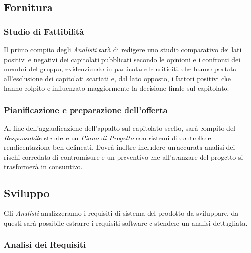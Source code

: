 \documentclass{scalatekids-article}
\begin{document}
\subsection{Fornitura}

\subsubsection{Studio di Fattibilità}

Il primo compito degli \textit{Analisti} sarà di redigere uno studio comparativo
dei lati positivi e negativi dei capitolati pubblicati secondo le opinioni e i
confronti dei membri del gruppo, evidenziando in particolare le criticità che
hanno portato all'esclusione dei capitolati scartati e, dal lato opposto, i
fattori positivi che hanno colpito e influenzato maggiormente la decisione
finale sul capitolato.

\subsubsection{Pianificazione e preparazione dell'offerta}

Al fine dell'aggiudicazione dell'appalto sul capitolato scelto, sarà compito del
\textit{Responsabile} stendere un \textit{Piano di Progetto} con sistemi di
controllo e rendicontazione ben delineati. Dovrà inoltre includere un'accurata
analisi dei rischi corredata di contromisure e un preventivo che all'avanzare
del progetto si trasformerà in consuntivo.

\subsection{Sviluppo}

Gli \textit{Analisti} analizzeranno i requisiti di sistema del prodotto da
sviluppare, da questi sarà possibile estrarre i requisiti software e stendere un
analisi dettagliata.

\subsubsection{Analisi dei Requisiti}
\end{document}
